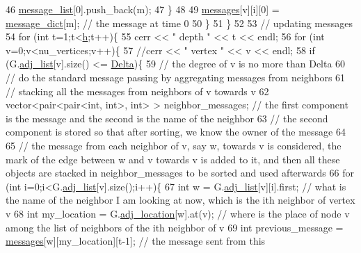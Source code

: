 \begin{DoxyCode}
46         \hyperlink{classgraph__message_aa17fdb629b423343edfafa97252763ef}{message\_list}[0].push\_back(m);
47       \}
48 
49       \hyperlink{classgraph__message_aac77e098f0acf9650116a8e51fe3b4b7}{messages}[v][i][0] = \hyperlink{classgraph__message_ad0a6d35ac8550fb7ff03ce90fce7d5a5}{message\_dict}[m]; \textcolor{comment}{// the message at time 0}
50     \}
51   \}
52 
53   \textcolor{comment}{// updating messages}
54   \textcolor{keywordflow}{for} (\textcolor{keywordtype}{int} t=1;t<\hyperlink{classgraph__message_a934d63ed7275c211e13c6fb68824ed46}{h};t++)\{
55     cerr << \textcolor{stringliteral}{" depth "} << t << endl;
56     \textcolor{keywordflow}{for} (\textcolor{keywordtype}{int} v=0;v<nu\_vertices;v++)\{
57       \textcolor{comment}{//cerr << " vertex " << v << endl;}
58       \textcolor{keywordflow}{if} (G.\hyperlink{classmarked__graph_a1a0bf7ca413a278763f7c878b3b6fd6f}{adj\_list}[v].size() <= \hyperlink{classgraph__message_a45dfd061b7bc73572e5132fbf66efd55}{Delta})\{
59         \textcolor{comment}{// the degree of v is no more than Delta}
60         \textcolor{comment}{// do the standard message passing by aggregating messages from neighbors}
61         \textcolor{comment}{// stacking all the messages from neighbors of v towards v}
62         vector<pair<pair<int, int>, \textcolor{keywordtype}{int}> > neighbor\_messages; \textcolor{comment}{// the first component is the message and the
       second is the name of the neighbor}
63         \textcolor{comment}{// the second component is stored so that after sorting, we know the owner of the message}
64 
65         \textcolor{comment}{// the message from each neighbor of v, say w,  towards v is considered, the mark of the edge
       between w and v towards v is added to it, and then all these objects are stacked in neighbor\_messages to be
       sorted and used afterwards }
66         \textcolor{keywordflow}{for} (\textcolor{keywordtype}{int} i=0;i<G.\hyperlink{classmarked__graph_a1a0bf7ca413a278763f7c878b3b6fd6f}{adj\_list}[v].size();i++)\{
67           \textcolor{keywordtype}{int} w = G.\hyperlink{classmarked__graph_a1a0bf7ca413a278763f7c878b3b6fd6f}{adj\_list}[v][i].first; \textcolor{comment}{// what is the name of the neighbor I am looking at now,
       which is the ith neighbor of vertex v }
68           \textcolor{keywordtype}{int} my\_location = G.\hyperlink{classmarked__graph_a3ae722ea9583ad23af34d789a88ac01a}{adj\_location}[w].at(v); \textcolor{comment}{// where is the place of node v among the
       list of neighbors of the ith neighbor of v}
69           \textcolor{keywordtype}{int} previous\_message = \hyperlink{classgraph__message_aac77e098f0acf9650116a8e51fe3b4b7}{messages}[w][my\_location][t-1]; \textcolor{comment}{// the message sent from this
}
\end{DoxyCode}
